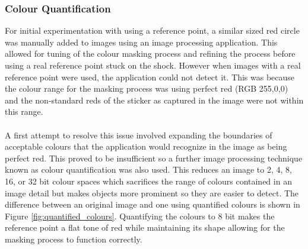		\subsubsection{Colour Quantification}
			For initial experimentation with using a reference point, a similar sized red circle was manually added to images using an image processing application. This allowed for tuning of the colour masking process and refining the process before using a real reference point stuck on the shock. However when images with a real reference point were used, the application could not detect it. This was because the colour range for the masking process was using perfect red (RGB 255,0,0) and the non-standard reds of the sticker as captured in the image were not within this range.
			\\\\
			A first attempt to resolve this issue involved expanding the boundaries of acceptable colours that the application would recognize in the image as being perfect red. This proved to be insufficient so a further image processing technique known as colour quantification was also used. This reduces an image to 2, 4, 8, 16, or 32 bit colour spaces which sacrifices the range of colours contained in an image detail but makes objects more prominent so they are easier to detect. The difference between an original image and one using quantified colours is shown in Figure \ref{fig:quantified_colours}. Quantifying the colours to 8 bit makes the reference point a flat tone of red while maintaining its shape allowing for the masking process to function correctly.
